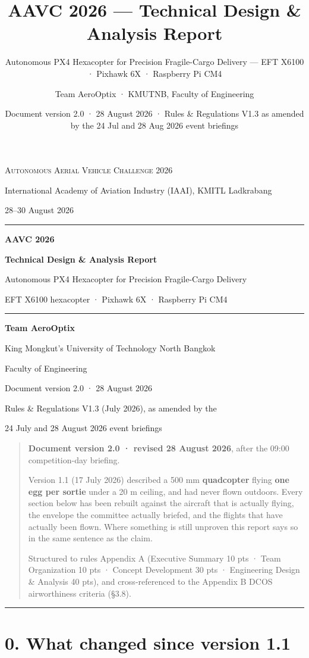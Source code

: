 \documentclass[
  10pt,
  a4paper,
  titlepage]{article}
\title{AAVC 2026 — Technical Design \& Analysis Report}
\subtitle{Autonomous PX4 Hexacopter for Precision Fragile-Cargo Delivery — EFT X6100 · Pixhawk 6X · Raspberry Pi CM4}
\author{Team AeroOptix · KMUTNB, Faculty of Engineering}
\date{Document version 2.0 · 28 August 2026 · Rules \& Regulations V1.3 as amended by the 24 Jul and 28 Aug 2026 event briefings}
\let\aavcoldtoc\tableofcontents
\renewcommand{\tableofcontents}{\aavcoldtoc\clearpage}
\renewcommand{\maketitle}{%
  \begin{titlepage}
    \centering
    \vspace*{1.8cm}
    {\scshape\large Autonomous Aerial Vehicle Challenge 2026\par}
    \vspace{0.5em}
    {International Academy of Aviation Industry (IAAI), KMITL Ladkrabang\par}
    {28--30 August 2026\par}
    \vspace{1.8cm}
    \rule{\textwidth}{1.1pt}\par
    \vspace{0.9cm}
    {\huge\bfseries AAVC 2026\par}
    \vspace{0.45em}
    {\huge\bfseries Technical Design \& Analysis Report\par}
    \vspace{0.9cm}
    {\large Autonomous PX4 Hexacopter for Precision Fragile-Cargo Delivery\par}
    \vspace{0.5em}
    {EFT X6100 hexacopter · Pixhawk 6X · Raspberry Pi CM4\par}
    \vspace{0.9cm}
    \rule{\textwidth}{1.1pt}\par
    \vspace{2.2cm}
    {\Large\bfseries Team AeroOptix\par}
    \vspace{0.6em}
    {King Mongkut's University of Technology North Bangkok\par}
    {Faculty of Engineering\par}
    \vfill
    {\small Document version 2.0 · 28 August 2026\par}
    \vspace{0.4em}
    {\small Rules \& Regulations V1.3 (July 2026), as amended by the\par}
    {\small 24 July and 28 August 2026 event briefings\par}
    \vspace{1.2cm}
  \end{titlepage}}
\begin{document}
\maketitle

{
\setcounter{tocdepth}{2}
\tableofcontents
}
\begin{quote}
\textbf{Document version 2.0 · revised 28 August 2026}, after the 09:00
competition-day briefing.

Version 1.1 (17 July 2026) described a 500 mm \textbf{quadcopter} flying
\textbf{one egg per sortie} under a 20 m ceiling, and had never flown
outdoors. Every section below has been rebuilt against the aircraft that
is actually flying, the envelope the committee actually briefed, and the
flights that have actually been flown. Where something is still unproven
this report says so in the same sentence as the claim.

Structured to rules Appendix A (Executive Summary 10 pts · Team
Organization 10 pts · Concept Development 30 pts · Engineering Design \&
Analysis 40 pts), and cross-referenced to the Appendix B DCOS
airworthiness criteria (§3.8).
\end{quote}

\begin{center}\rule{0.5\linewidth}{0.5pt}\end{center}

\hypertarget{what-changed-since-version-1.1}{%
\section{0. What changed since version
1.1}\label{what-changed-since-version-1.1}}
\end{document}
